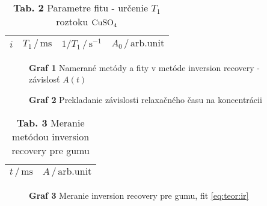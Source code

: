 \documentclass[a4paper, 10pt]{article}
\newcommand{\unit}[1]{\ensuremath{\, \mathrm{#1}}}
\begin{document}
\begin{table}[h!]
\centering
\hspace*{60pt}
\begin{tabular}{c|c|c|c}
$ i $ & 
$ T_1\,/\unit{ms}$ &
$ 1/T_1\,/\unit{s^{-1}}$ &
$ A_0\,/\unit{arb. unit}$ 
\\
\midrule 

\end{tabular}
\newline
\vspace*{2pt}
\caption*{\textbf{ Tab. 2} Parametre fitu - určenie $T_1$ roztoku $\ce{CuSO4}$}
\end{table}

\begin{figure}[h!]
\centering
\vspace*{-15pt}

\caption*{\textbf{Graf 1} Namerané metódy a fity v metóde inversion recovery - závislosť $A(t)$}
\end{figure}

\begin{figure}[h!]
\centering
\vspace*{-15pt}

\textbf{Graf 2} Prekladanie závislosti relaxačného času na koncentrácii 
\end{figure}

\begin{table}[h!]
\centering
\hspace*{60pt}
\begin{tabular}{c|c}
$ t\,/\unit{ms} $ & 
$ A\,/\unit{arb. unit}$ 
\\
\midrule 

\end{tabular}
\newline
\vspace*{2pt}
\caption*{\textbf{ Tab. 3} Meranie metódou inversion recovery pre gumu}
\end{table}

\begin{figure}[h!]
\centering
\vspace*{-15pt}

\caption*{\textbf{Graf 3} Meranie inversion recovery pre gumu, fit \ref{eq:teor:ir}}
\end{figure}
\end{document}
